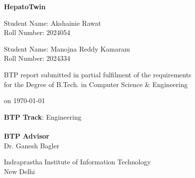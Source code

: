 


\newcommand{\condBreak}[1]{\ifx#1\empty\else \\ \fi }

\begin{titlepage}
    \begin{center}
        {\huge \bf HepatoTwin}
        \vspace{.3in}

        {\Large Student Name: Akshainie Rawat} \\
        {\large Roll Number: 2024054} \\

        \vspace{.1in}

        {\Large Student Name: Manojna Reddy Kamaram} \\
        {\large Roll Number: 2024334} \\

        \vspace{1.3in}

        {BTP report submitted in partial fulfilment of the requirements
        \\for the Degree of B.Tech. in Computer Science \& Engineering}

        {on \today \\}

        \vspace{.65in}

        \textbf{BTP Track}: Engineering\\
        \quad\\

        {\textbf{BTP Advisor} \\
            Dr. Ganesh Bagler \\
        }

        \vspace{3in}

        {Indraprastha Institute of Information Technology\\
        New Delhi}

    \end{center}
\end{titlepage}
